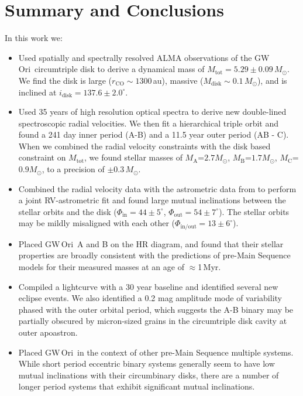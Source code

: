 \documentclass[twocolumn]{aastex61}
\newcommand{\obj}{GW\,Ori}
\begin{document}
\section{Summary and Conclusions} \label{sec:summary}
In this work we:
\begin{itemize}
\item Used spatially and spectrally resolved ALMA observations of the \obj\ circumtriple disk to derive a dynamical mass of $M_\mathrm{tot} = 5.29 \pm 0.09\,M_\odot$. We find the disk is large ($r_\mathrm{CO} \sim 1300\,$au), massive ($M_\mathrm{disk} \sim 0.1\,M_\odot$), and is inclined at $i_\mathrm{disk} = 137.6\pm2.0^\circ$.
\item Used 35 years of high resolution optical spectra to derive new double-lined spectroscopic radial velocities. We then fit a hierarchical triple orbit and found a 241 day inner period (A-B) and a 11.5 year outer period (AB - C). When we combined the radial velocity constraints with the disk based constraint on $M_\mathrm{tot}$, we found stellar masses of $M_\mathrm{A}$=$2.7 M_\odot$, $M_\mathrm{B}$=$1.7 M_\odot$, $M_\mathrm{C}$=$0.9 M_\odot$, to a precision of $\pm 0.3\,M_\odot$.
\item Combined the radial velocity data with the astrometric data from \citet{berger11} to perform a joint RV-astrometric fit and found large mutual inclinations between the stellar orbits and the disk ($\Phi_\mathrm{in} = 44\pm5^\circ$, $\Phi_\mathrm{out} = 54 \pm 7^\circ$). The stellar orbits may be mildly misaligned with each other ($\Phi_\mathrm{in/out} = 13 \pm 6^\circ$).
\item Placed \obj~A and B on the HR diagram, and found that their stellar properties are broadly consistent with the predictions of pre-Main Sequence models for their measured masses at an age of $\approx$1\,Myr.
\item Compiled a lightcurve with a 30 year baseline and identified several new eclipse events. We also identified a 0.2 mag amplitude mode of variability phased with the outer orbital period, which suggests the A-B binary may be partially obscured by micron-sized grains in the circumtriple disk cavity at outer apoastron.
\item Placed \obj\ in the context of other pre-Main Sequence multiple systems. While short period eccentric binary systems generally seem to have low mutual inclinations with their circumbinary disks, there are a number of longer period systems that exhibit significant mutual inclinations.
\end{itemize}
\end{document}
